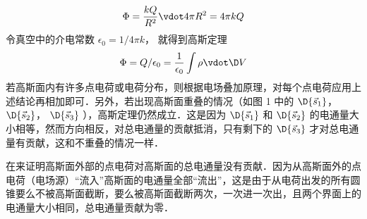 \begin{enumerate}
\begin{equation}
\Phi  = \frac{{kQ}}{{{R^2}}} \vdot 4\pi {R^2} = 4\pi kQ
\end{equation} 
令真空中的介电常数 ${\epsilon_0} = {1}/{{4\pi k}}$， 就得到高斯定理
\begin{equation}
\Phi  = Q/{\epsilon_0} = \frac{1}{{{\epsilon_0}}}\int {\rho  \vdot \D V} 
\end{equation} 
若高斯面内有许多点电荷或电荷分布，则根据电场叠加原理，对每个点电荷应用上述结论再相加即可．另外，若出现高斯面重叠的情况（如图 1 中的 $\D {\vec s_1}$，  $\D {\vec s_2}$，  $\D {\vec s_3}$ ），高斯定理仍然成立．这是因为 $\D {\vec s_1}$ 和 $\D {\vec s_2}$ 的电通量大小相等，然而方向相反，对总电通量的贡献抵消，只有剩下的 $\D {\vec s_3}$ 才对总电通量有贡献，这和不重叠的情况一样．

在来证明高斯面外部的点电荷对高斯面的总电通量没有贡献．因为从高斯面外的点电荷（电场源）“流入”高斯面的电通量全部“流出”，这是由于从电荷出发的所有圆锥要么不被高斯面截断，要么被高斯面截断两次，一次进一次出，且两个界面上的电通量大小相同，总电通量贡献为零．
\end{enumerate}
 
 
 
 
 
 
 
 
 